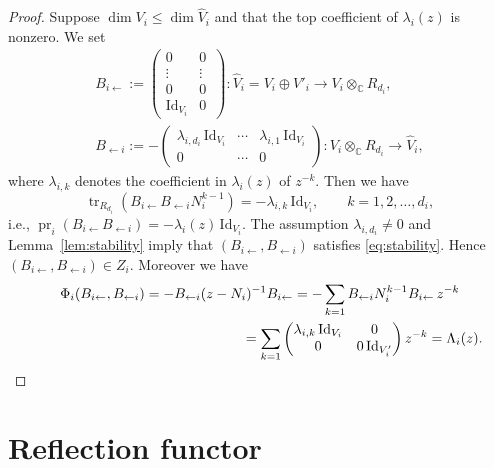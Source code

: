 \documentclass[11pt]{article}
\newcommand{\shortleftarrow}{\leftarrow}
\newcommand{\slar}{\shortleftarrow}
\numberwithin{equation}{section}
\theoremstyle{definition}
\newcommand{\lemref}[1]{Lemma~\ref{#1}}
\newcommand{\C}{\mathbb{C}} %
\newcommand{\Ker}{\operatorname{Ker}}
\newcommand{\rank}{\operatorname{rank}}
\newcommand{\tr}{\operatorname{tr}}
\newcommand{\unit}{\mathrm{Id}}
\newcommand{\prj}{\operatorname{pr}}
\begin{document}
\begin{proof}
Suppose $\dim V_i \leq \dim \widehat{V}_i$
and that the top coef\/f\/icient of $\lambda_i(z)$ is nonzero. We set
\begin{gather*}
B_{i \slar}  := \begin{pmatrix}
0 & 0\, \\ \vdots & \vdots\, \\ 0 & 0\, \\ \unit_{V_i} & 0\,
\end{pmatrix}
\colon \widehat{V}_i = V_i \oplus V'_i \to V_i \otimes_\C R_{d_i}, \\
B_{\slar i}  := - \begin{pmatrix}
\lambda_{i,d_i}\,\unit_{V_i} & \cdots & \lambda_{i,1}\,\unit_{V_i} \\
0 & \cdots & 0
\end{pmatrix}
\colon V_i \otimes_\C R_{d_i} \to \widehat{V}_i,
\end{gather*}
where $\lambda_{i,k}$ denotes the coef\/f\/icient in $\lambda_i(z)$ of $z^{-k}$.
Then we have
\[
\tr_{R_{d_i}}(B_{i \slar}  B_{\slar i} N_i^{k-1})
= -\lambda_{i,k}\,\unit_{V_i}, \qquad k=1,2, \dots ,d_i,
\]
i.e., $\prj_i(B_{i \slar}  B_{\slar i})=-\lambda_i(z)\,\unit_{V_i}$.
The assumption $\lambda_{i,d_i} \neq 0$ and
\lemref{lem:stability} imply that
$(B_{i \slar},B_{\slar i})$ satisf\/ies \eqref{eq:stability}.
Hence $(B_{i \slar},B_{\slar i}) \in Z_i$.
Moreover we have
\begin{gather*}
\Phi_i(B_{i \slar},B_{\slar i})=
-B_{\slar i}(z-N_i)^{-1}B_{i \slar}  =
-\sum_{k=1}B_{\slar i}N_i^{k-1}B_{i \slar}\,z^{-k} \\
\hphantom{\Phi_i(B_{i \slar},B_{\slar i})=
-B_{\slar i}(z-N_i)^{-1}B_{i \slar}}{}
=\sum_{k=1}
\begin{pmatrix}
\lambda_{i,k}\,\unit_{V_i} & 0 \\
0 & 0\,\unit_{V'_i} \end{pmatrix} z^{-k} = \Lambda_i(z).\tag*{\qed}
\end{gather*}
\renewcommand{\qed}{}
\end{proof}

\section{Ref\/lection functor}\label{sec:reflection}
\end{document}
